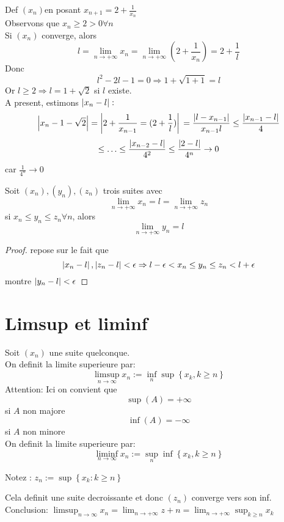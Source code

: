 \documentclass[../main.tex]{subfiles}
\begin{document}
\begin{exemple}
	Def $(x_n)$en posant $x_{n+1} =2 + \frac{1}{x_n}$\\
	Observons que $x_n \geq 2 >0 \forall n$\\
	Si  $(x_n)$ converge, alors
	\[ 
		l = \lim_{n \to  + \infty} x_n = \lim_{n \to  + \infty} (2 + \frac{1}{x_n}) = 2+ \frac{1}{l}
	\]
	Donc
	\[ 
		l^{2}-2l -1 = 0 \Rightarrow 1 + \sqrt{1+1} =l
	\]
	Or $l\geq 2 \Rightarrow l = 1+\sqrt{2}$ si $l$ existe.\\
	A present, estimons $\left\vert x_n -l\right\vert:$ 
	\[ 
		\left\vert x_n-1 -\sqrt{2}\right\vert =	 \left\vert2 + \frac{1}{x_{n-1}} = ( 2+\frac{1}{l})\right\vert\\
		= \frac{\left\vert l-x_{n-1} \right\vert}{x_{n-1} l} \leq \frac{\left\vert x_{n-1} -l\right\vert}{4}
	\]
\[ 
	\leq \ldots \leq \frac{\left\vert x_{n-2} -l\right\vert}{4^{2}} \leq \frac{\left\vert2-l\right\vert}{4^{n}}\to 0 
\]
car $\frac{1}{4^{n}} \to 0$
\end{exemple}
\begin{lemma}\label{lemma:deux_gendarmes}
	Soit $( x_n ), ( y_n), ( z_n)$ trois suites avec 
	\[ 
	\lim_{n \to  + \infty} x_n = l = \lim_{n \to  + \infty} z_n
	\]
	si $x_n \leq y_n\leq z_n \forall n$, alors
	\[ 
	\lim_{n \to  + \infty} y_n =l
	\]
	
\end{lemma}

\begin{proof}
repose sur le fait que 
\[ 
	\left\vert x_n-l\right\vert, \left\vert z_n-l\right\vert < \epsilon \Rightarrow l-\epsilon <x_n\leq y_n \leq z_n < l+\epsilon
\]
montre $\left\vert y_n-l\right\vert<\epsilon$
\end{proof}
\section{Limsup et liminf}

\begin{defn}\label{defn:limsup_et_liminf}
	Soit $(x_n)$ une suite quelconque.\\
	On definit la limite superieure par:
	\[ 
		\limsup_{n \to \infty } x_n :=\inf_{n} \sup \left\{ x_k, k\geq n \right\} 
	\]
	Attention: Ici on convient que
	\[ 
		\sup(A) = + \infty 
	\]
	si $A$ non majore
	\[ 
		\inf(A) = - \infty 
	\]
	si $A$ non minore\\
	
	On definit la limite superieure par:
	\[ 
		\liminf_{n \to \infty } x_n :=\sup_{n} \inf \left\{ x_k, k\geq n \right\} 
	\]
\end{defn}
Notez :  $z_n := \sup \left\{ x_k : k \geq n \right\} $

Cela definit une suite decroissante et donc $(z_n)$ converge vers son inf.\\
Conclusion: $\limsup_{n\to \infty }x_n = \lim_{n \to  + \infty} z+n = \lim_{n \to  + \infty} \sup_{k\geq n} x_k $







	
\end{document}
